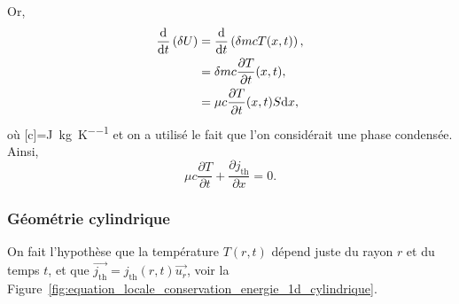                 Or,
                \begin{align*}
                    \frac{\mathrm{d}}{\mathrm{d} t}\left(\delta U\right)
                    &=
                    \frac{\mathrm{d}}{\mathrm{d} t}\left(\delta m cT(x,t)\right),\\
                    &=
                    \delta m c\frac{\partial T}{\partial t}(x,t),\\
                    &=\mu c\frac{\partial T}{\partial t}(x,t) S\mathrm{d} x,
                \end{align*}
                où [c]=\si{\joule\per\kilogram\per\kelvin} et on a utilisé le fait que l'on considérait une phase condensée. Ainsi,
                \begin{equation*}
                    \boxed{
                        \mu c\frac{\partial T}{\partial t}+\frac{\partial j_{\text{th}}}{\partial x}=0.
                    }
                \end{equation*}

        \subsubsection{Géométrie cylindrique}

            On fait l'hypothèse que la température $T(r,t)$ dépend juste du rayon $r$ et du temps $t$, et que $\vec{j_{\text{th}}}=j_{\text{th}}(r,t)\vec{u_r}$, voir la Figure~\ref{fig:equation_locale_conservation_energie_1d_cylindrique}.


